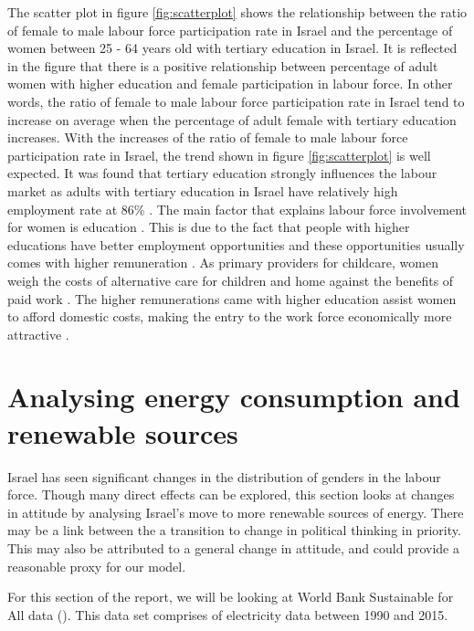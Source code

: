 \documentclass[11pt,a4paper,]{article}
\begin{document}
The scatter plot in figure \ref{fig:scatterplot} shows the relationship
between the ratio of female to male labour force participation rate in
Israel and the percentage of women between 25 - 64 years old with
tertiary education in Israel. It is reflected in the figure that there
is a positive relationship between percentage of adult women with higher
education and female participation in labour force. In other words, the
ratio of female to male labour force participation rate in Israel tend
to increase on average when the percentage of adult female with tertiary
education increases. With the increases of the ratio of female to male
labour force participation rate in Israel, the trend shown in figure
\ref{fig:scatterplot} is well expected. It was found that tertiary
education strongly influences the labour market as adults with tertiary
education in Israel have relatively high employment rate at 86\%
\autocite{oecd2016}. The main factor that explains labour force
involvement for women is education \autocite{Stier2013}. This is due to
the fact that people with higher educations have better employment
opportunities and these opportunities usually comes with higher
remuneration \autocite{pm2014}. As primary providers for childcare,
women weigh the costs of alternative care for children and home against
the benefits of paid work \autocite{Stier2013}. The higher remunerations
came with higher education assist women to afford domestic costs, making
the entry to the work force economically more attractive
\autocite{pm2014}.

\section*{Analysing energy consumption and renewable sources}

Israel has seen significant changes in the distribution of genders in
the labour force. Though many direct effects can be explored, this
section looks at changes in attitude by analysing Israel's move to more
renewable sources of energy. There may be a link between the a
transition to change in political thinking in priority. This may also be
attributed to a general change in attitude, and could provide a
reasonable proxy for our model.

For this section of the report, we will be looking at World Bank
Sustainable for All data (\textcite{TheWorldBank2018}). This data set
comprises of electricity data between 1990 and 2015.
\end{document}
